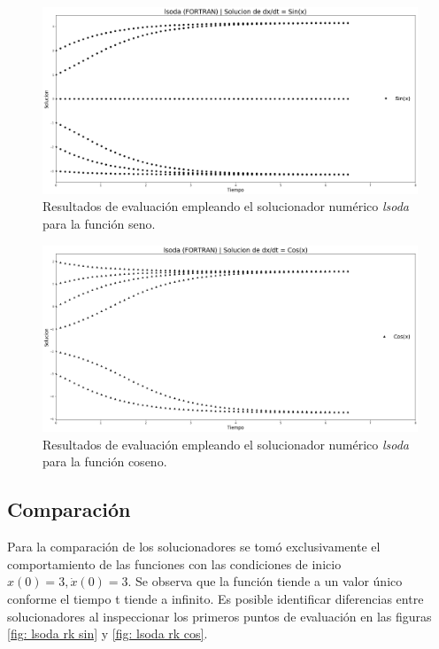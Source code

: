 \documentclass[12pt,letterpaper]{article}
\begin{document}
\begin{figure}[hb]
 \centering
 \includegraphics[scale=0.2]{img/lsoda_sin.png}
 \caption{Resultados de evaluación empleando el solucionador numérico \emph{lsoda} para la función seno.}
 \label{fig: lsoda sin}
\end{figure}

\begin{figure}[hb]
 \centering
 \includegraphics[scale=0.2]{img/lsoda_cos.png}
  \caption{Resultados de evaluación empleando el solucionador numérico \emph{lsoda} para la función coseno.}
 \label{fig: lsoda cos}
\end{figure}

\pagebreak

\subsection{Comparación}

Para la comparación de los solucionadores se tomó exclusivamente el comportamiento de las funciones con las condiciones de inicio $x(0) = 3, \dot{x}(0)=3$. Se observa que la función tiende a un valor único conforme el tiempo t tiende a infinito. Es posible identificar diferencias entre solucionadores
al inspeccionar los primeros puntos de evaluación en las figuras \ref{fig: lsoda rk sin} y \ref{fig: lsoda rk cos}.
\end{document}
